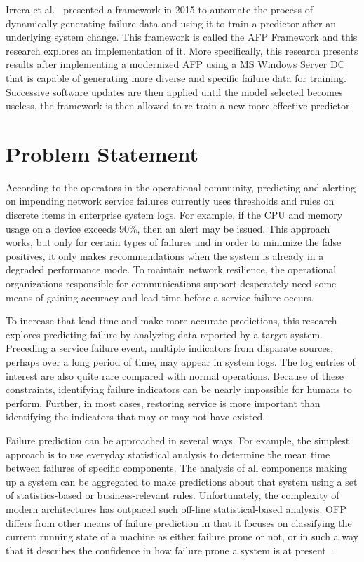 Irrera et al.~\cite{irrera2015} presented a framework in 2015 to automate the
process of dynamically generating failure data and using it to train a
predictor after an underlying system change.  This framework is called the
\ac{AFP} Framework and this research explores an implementation of it.  More
specifically, this research presents results after implementing a modernized
\ac{AFP} using a \ac{MS} Windows Server \ac{DC} that is capable of
generating more diverse and specific failure data for training.  Successive
software updates are then applied until the model selected becomes useless, the
framework is then allowed to re-train a new more effective predictor.

\section{Problem Statement}
According to the operators in the operational community, predicting and
alerting on impending network service failures currently uses thresholds and
rules on discrete items in enterprise system logs.  For example, if the
\ac{CPU} and memory usage on a device exceeds 90\%, then an alert may be
issued.  This approach works, but only for certain types of failures and in
order to minimize the false positives, it only makes recommendations when the
system is already in a degraded performance mode.  To maintain network
resilience, the operational organizations responsible for communications
support desperately need some means of gaining accuracy and lead-time before a
service failure occurs.  

To increase that lead time and make more accurate predictions, this research
explores predicting failure by analyzing data reported by a target system.
Preceding a service failure event, multiple indicators from disparate sources,
perhaps over a long period of time, may appear in system logs.  The log entries
of interest are also quite rare compared with normal operations.  Because of
these constraints, identifying failure indicators can be nearly impossible for
humans to perform.  Further, in most cases, restoring service is more important
than identifying the indicators that may or may not have existed.  

Failure prediction can be approached in several ways. For example, the simplest
approach is to use everyday statistical analysis to determine the mean time
between failures of specific components. The analysis of all components making
up a system can be aggregated to make predictions about that system using a set
of statistics-based or business-relevant rules.  Unfortunately, the complexity
of modern architectures has outpaced such off-line statistical-based analysis.
\ac{OFP} differs from other means of failure prediction in that it focuses on
classifying the current running state of a machine as either failure prone or
not, or in such a way that it describes the confidence in how failure prone a
system is at present~\cite{salfnerSurvey}.

